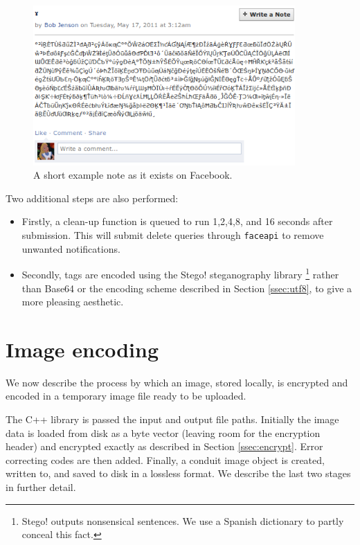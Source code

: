    \begin{figure}[tbph]
        \begin{center}
                \includegraphics[width=10cm]{screens/note.png}
            \caption{A short example note as it exists on Facebook.}
            \label{scn:note}
        \end{center}
    \end{figure}

Two additional steps are also performed:

\begin{itemize}
    \item Firstly, a clean-up function is queued to run 1,2,4,8, and 16 seconds after submission. This will submit delete queries through {\tt faceapi} to remove unwanted notifications.
    
    \item Secondly, tags are encoded using the Stego! steganography library \footnote{Stego! outputs nonsensical sentences. We use a Spanish dictionary to partly conceal this fact.} rather than Base64 or the encoding scheme described in Section \ref{ssec:utf8}, to give a more pleasing aesthetic.
\end{itemize}

\FloatBarrier
\section{Image encoding}
\label{sec:img-sub}

We now describe the process by which an image, stored locally, is encrypted and encoded in a temporary image file ready to be uploaded.

The C++ library is passed the input and output file paths. Initially the image data is loaded from disk as a byte vector (leaving room for the encryption header) and encrypted exactly as described in Section \ref{ssec:encrypt}. Error correcting codes are then added. Finally, a conduit image object is created, written to, and saved to disk in a lossless format. We describe the last two stages in further detail.

